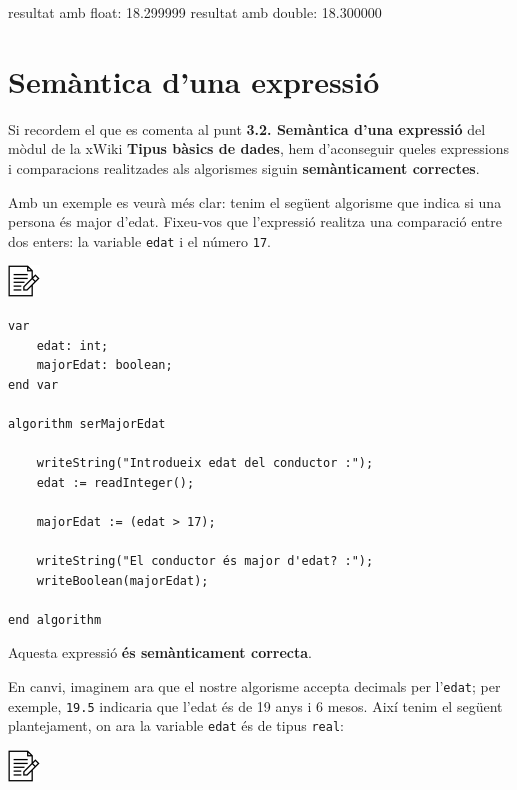 \documentclass[]{book}
\newenvironment{Shaded}{\begin{snugshade}}{\end{snugshade}}
\newcommand{\DataTypeTok}[1]{\textcolor[rgb]{0.13,0.29,0.53}{#1}}
\newcommand{\FloatTok}[1]{\textcolor[rgb]{0.00,0.00,0.81}{#1}}
\newcommand{\NormalTok}[1]{#1}
\begin{document}
\begin{Shaded}
\begin{Highlighting}[]
\NormalTok{resultat amb  }\DataTypeTok{float}\NormalTok{: }\FloatTok{18.299999}
\NormalTok{resultat amb }\DataTypeTok{double}\NormalTok{: }\FloatTok{18.300000}
\end{Highlighting}
\end{Shaded}

\hypertarget{semantica-duna-expressio}{%
\section{Semàntica d'una expressió}\label{semantica-duna-expressio}}

Si recordem el que es comenta al punt \textbf{3.2. Semàntica d'una expressió} del mòdul de la xWiki \textbf{Tipus bàsics de dades}, hem d'aconseguir queles expressions i comparacions realitzades als algorismes siguin \textbf{semànticament correctes}.

Amb un exemple es veurà més clar: tenim el següent algorisme que indica si una persona és major d'edat. Fixeu-vos que l'expressió realitza una comparació entre dos enters: la variable \texttt{edat} i el número \texttt{17}.

\includegraphics{./img/alg.png}

\begin{verbatim}
var
    edat: int;
    majorEdat: boolean;
end var

algorithm serMajorEdat

    writeString("Introdueix edat del conductor :");
    edat := readInteger();

    majorEdat := (edat > 17);

    writeString("El conductor és major d'edat? :");
    writeBoolean(majorEdat);

end algorithm
\end{verbatim}

Aquesta expressió \textbf{és semànticament correcta}.

En canvi, imaginem ara que el nostre algorisme accepta decimals per l'\texttt{edat}; per exemple, \texttt{19.5} indicaria que l'edat és de 19 anys i 6 mesos. Així tenim el següent plantejament, on ara la variable \texttt{edat} és de tipus \texttt{real}:

\includegraphics{./img/alg.png}
\end{document}
